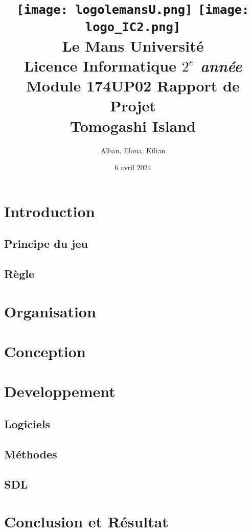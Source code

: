 \documentclass{article}
\begin{document}
\begin{titlepage}
    \title{
        \texttt{[image: logolemansU.png]}
        \hspace{150pt}
        \texttt{[image: logo\_IC2.png]}
        \\[2cm]
        \color{blue} \textbf{Le Mans Université} \\
        \color{black} Licence Informatique \textit{$2^{e}$ année} \\
        Module 174UP02 Rapport de Projet \\
        \textbf{Tomogashi Island}
    }
    \author{Alban, Elona, Kilian }
    \date{6 avril 2024}
    \maketitle
    


\end{titlepage}

\newpage
\tableofcontents

\newpage

\section{Introduction}
    \subsection{Principe du jeu}
    \subsection{Règle}
\section{Organisation}
\section{Conception}
\section{Developpement}
    \subsection{Logiciels}
    \subsection{Méthodes}
    \subsection{SDL}
\section{Conclusion et Résultat}
\end{document}
